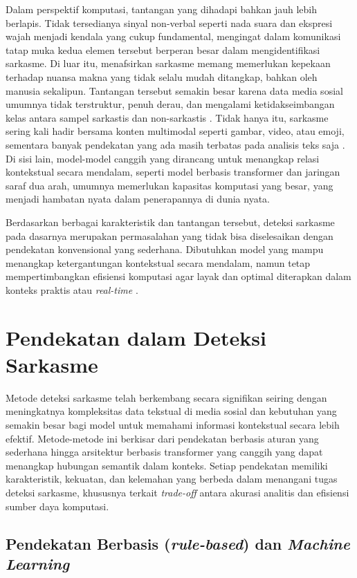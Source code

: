 Dalam perspektif komputasi, tantangan yang dihadapi bahkan jauh lebih berlapis. Tidak tersedianya sinyal non-verbal seperti nada suara dan ekspresi wajah menjadi kendala yang cukup fundamental, mengingat dalam komunikasi tatap muka kedua elemen tersebut berperan besar dalam mengidentifikasi sarkasme. Di luar itu, menafsirkan sarkasme memang memerlukan kepekaan terhadap nuansa makna yang tidak selalu mudah ditangkap, bahkan oleh manusia sekalipun. Tantangan tersebut semakin besar karena data media sosial umumnya tidak terstruktur, penuh derau, dan mengalami ketidakseimbangan kelas antara sampel sarkastis dan non-sarkastis \cite{dubey2025unpacking}. Tidak hanya itu, sarkasme sering kali hadir bersama konten multimodal seperti gambar, video, atau emoji, sementara banyak pendekatan yang ada masih terbatas pada analisis teks saja \cite{dhumpati2025sarcasm}. Di sisi lain, model-model canggih yang dirancang untuk menangkap relasi kontekstual secara mendalam, seperti model berbasis transformer dan jaringan saraf dua arah, umumnya memerlukan kapasitas komputasi yang besar, yang menjadi hambatan nyata dalam penerapannya di dunia nyata.

Berdasarkan berbagai karakteristik dan tantangan tersebut, deteksi sarkasme pada dasarnya merupakan permasalahan yang tidak bisa diselesaikan dengan pendekatan konvensional yang sederhana. Dibutuhkan model yang mampu menangkap ketergantungan kontekstual secara mendalam, namun tetap mempertimbangkan efisiensi komputasi agar layak dan optimal diterapkan dalam konteks praktis atau \textit{real-time} \cite{dubey2025unpacking}.

\section{Pendekatan dalam Deteksi Sarkasme}

Metode deteksi sarkasme telah berkembang secara signifikan seiring dengan meningkatnya kompleksitas data tekstual di media sosial dan kebutuhan yang semakin besar bagi model untuk memahami informasi kontekstual secara lebih efektif. Metode-metode ini berkisar dari pendekatan berbasis aturan yang sederhana hingga arsitektur berbasis transformer yang canggih yang dapat menangkap hubungan semantik dalam konteks. Setiap pendekatan memiliki karakteristik, kekuatan, dan kelemahan yang berbeda dalam menangani tugas deteksi sarkasme, khususnya terkait \textit{trade-off} antara akurasi analitis dan efisiensi sumber daya komputasi.

\subsection{Pendekatan Berbasis (\textit{rule-based}) dan \textit{Machine Learning}}

